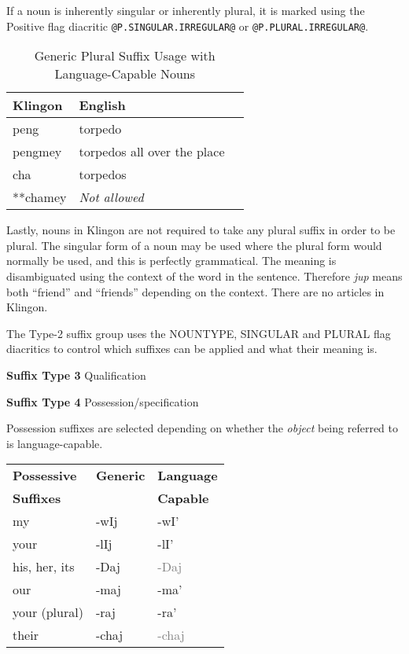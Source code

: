 \documentclass[11pt]{article}
\begin{document}
If a noun is inherently singular or inherently plural, it is marked using the Positive flag diacritic \texttt{@P.SINGULAR.IRREGULAR@} or \texttt{@P.PLURAL.IRREGULAR@}.
	
	\begin{table}[h]
	\begin{center}
	\begin{tabular}{lll}
	\toprule
	\bf Klingon & \bf English \\
	\midrule
	peng & torpedo \\
	pengmey & torpedos all over the place \\
	cha & torpedos \\
	**chamey & \it Not allowed \\
	\bottomrule
	\end{tabular}
	\end{center}
	\caption{Generic Plural Suffix Usage with Language-Capable Nouns}
	\end{table}

Lastly, nouns in Klingon are not required to take any plural suffix in order to be plural. The singular form of a noun may be used where the plural form would normally be used, and this is perfectly grammatical. The meaning is disambiguated using the context of the word in the sentence. Therefore \textit{jup} means both ``friend'' and ``friends'' depending on the context. There are no articles in Klingon.
	
The Type-2 suffix group uses the NOUNTYPE, SINGULAR and PLURAL flag diacritics to control which suffixes can be applied and what their meaning is.

\textbf{Suffix Type 3} Qualification
	
\textbf{Suffix Type 4} Possession/specification
	
Possession suffixes are selected depending on whether the \textit{object} being referred to is language-capable.

	\begin{center}
	\begin{tabular}{lll}
	\toprule
	\bf{Possessive} & \bf{Generic} & \bf{Language} \\
	\bf{Suffixes} & & \bf{Capable} \\
	\midrule
	my & -wIj & -wI' \\ \hline
	your & -lIj & -lI' \\ \hline
	his, her, its & -Daj & \textcolor{gray}{-Daj} \\ \hline
	our & -maj & -ma' \\ \hline
	your (plural) & -raj & -ra' \\ \hline
	their & -chaj & \textcolor{gray}{-chaj} \\
	\bottomrule
	\end{tabular}
	\end{center}
	
\end{document}
